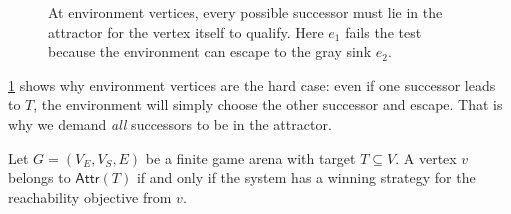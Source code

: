 \begin{figure}[ht]
\centering
{}
\caption{At environment vertices, every possible successor must lie in
the attractor for the vertex itself to qualify.  Here $e_1$ fails the
test because the environment can escape to the gray sink $e_2$.}
\label{fig:attractor-control}
\end{figure}

\cref{fig:attractor-control} shows why environment vertices are the
hard case: even if one successor leads to $T$, the environment will
simply choose the other successor and escape.  That is why we demand
\emph{all} successors to be in the attractor.

\begin{theorem}
\label{thm:attractor-correctness}
Let $G=(V_E,V_S,E)$ be a finite game arena with target $T\subseteq V$.
A vertex $v$ belongs to $\mathsf{Attr}(T)$ if and only if the system has
a winning strategy for the reachability objective from $v$.
\end{theorem}

